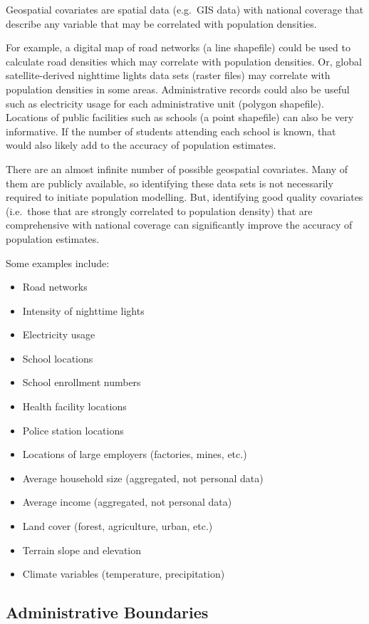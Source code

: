\documentclass[]{book}
\providecommand{\tightlist}{%
  \setlength{\itemsep}{0pt}\setlength{\parskip}{0pt}}
\begin{document}
Geospatial covariates are spatial data (e.g.~GIS data) with national
coverage that describe any variable that may be correlated with
population densities.

For example, a digital map of road networks (a line shapefile) could be
used to calculate road densities which may correlate with population
densities. Or, global satellite-derived nighttime lights data sets
(raster files) may correlate with population densities in some areas.
Administrative records could also be useful such as electricity usage
for each administrative unit (polygon shapefile). Locations of public
facilities such as schools (a point shapefile) can also be very
informative. If the number of students attending each school is known,
that would also likely add to the accuracy of population estimates.

There are an almost infinite number of possible geospatial covariates.
Many of them are publicly available, so identifying these data sets is
not necessarily required to initiate population modelling. But,
identifying good quality covariates (i.e.~those that are strongly
correlated to population density) that are comprehensive with national
coverage can significantly improve the accuracy of population estimates.

Some examples include:

\begin{itemize}
\tightlist
\item
  Road networks
\item
  Intensity of nighttime lights
\item
  Electricity usage
\item
  School locations
\item
  School enrollment numbers
\item
  Health facility locations
\item
  Police station locations
\item
  Locations of large employers (factories, mines, etc.)
\item
  Average household size (aggregated, not personal data)
\item
  Average income (aggregated, not personal data)
\item
  Land cover (forest, agriculture, urban, etc.)
\item
  Terrain slope and elevation
\item
  Climate variables (temperature, precipitation)
\end{itemize}

\subsection{Administrative
Boundaries}\label{administrative-boundaries-1}
\end{document}
